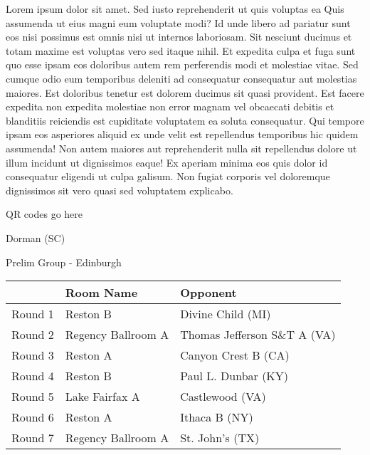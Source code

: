 \documentclass{article}%
\begin{document}
\vspace*{8pt}%
\linebreak%
\newline%
\newline%
Lorem ipsum dolor sit amet. Sed iusto reprehenderit ut quis voluptas ea Quis assumenda ut eius magni eum voluptate modi? Id unde libero ad pariatur sunt eos nisi possimus est omnis nisi ut internos laboriosam. Sit nesciunt ducimus et totam maxime est voluptas vero sed itaque nihil. Et expedita culpa et fuga sunt quo esse ipsam eos doloribus autem rem perferendis modi et molestiae vitae.\newline%
\newline%
Sed cumque odio eum temporibus deleniti ad consequatur consequatur aut molestias maiores. Est doloribus tenetur est dolorem ducimus sit quasi provident. Est facere expedita non expedita molestiae non error magnam vel obcaecati debitis et blanditiis reiciendis est cupiditate voluptatem ea soluta consequatur. Qui tempore ipsam eos asperiores aliquid ex unde velit est repellendus temporibus hic quidem assumenda!\newline%
\newline%
Non autem maiores aut reprehenderit nulla sit repellendus dolore ut illum incidunt ut dignissimos eaque! Ex aperiam minima eos quis dolor id consequatur eligendi ut culpa galisum. Non fugiat corporis vel doloremque dignissimos sit vero quasi sed voluptatem explicabo.\newline%
\newline%
%
\vspace*{30pt}%
\begin{center}%
\begin{Huge}%
QR codes go here%
\end{Huge}%
\end{center}%
\newpage%
%
\begin{center}%
\begin{Huge}%
Dorman (SC)%
\end{Huge}%
\vspace*{8pt}%
\linebreak%
\begin{Large}%
Prelim Group {-} Edinburgh%
\end{Large}%
\end{center}%
\begin{tabularx}{\textwidth}{|c|Y|Y|}%
\hline%
&Room Name&Opponent\\%
\hline%
Round 1&Reston B&Divine Child (MI)\\%
Round 2&Regency Ballroom A&Thomas Jefferson S\&T A (VA)\\%
Round 3&Reston A&Canyon Crest B (CA)\\%
Round 4&Reston B&Paul L. Dunbar (KY)\\%
Round 5&Lake Fairfax A&Castlewood (VA)\\%
Round 6&Reston A&Ithaca B (NY)\\%
Round 7&Regency Ballroom A&St. John's (TX)\\%
\hline%
\end{tabularx}%
\end{document}
